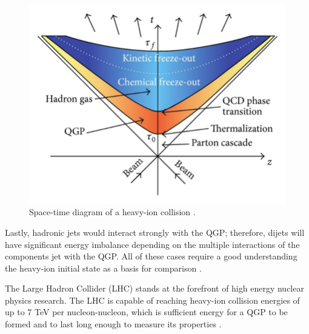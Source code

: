 \begin{figure}[h!]
\begin{centering}
\includegraphics[width=5in]{Chapter1/importfigs/The-space-time-evolution-of-heavy-ion-collision-The-figure-is-taken-from-28.png}
\par\end{centering}
\caption{Space-time diagram of a heavy-ion collision \cite{Wang:2012jua}.\label{fig:historyHI}}
\end{figure}

Lastly, hadronic jets would interact strongly with the QGP; therefore, dijets will have significant energy imbalance depending on the multiple interactions of the components jet with the QGP. All of these cases require a good understanding the heavy-ion initial state as a basis for comparison \cite{Vogt:1998kna}. 

The Large Hadron Collider (LHC) stands at the forefront of high energy nuclear physics research. The LHC is capable of reaching heavy-ion collision energies of up to 7 TeV per nucleon-nucleon, which is sufficient energy for a QGP to be formed and to last long enough to measure its properties \cite{Roland:2014jsa,Frankfurt:2005mc,Vogt:2002ve}.